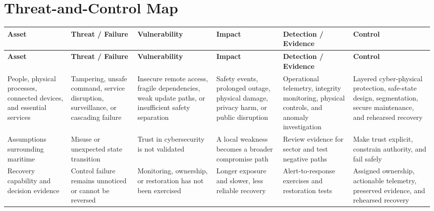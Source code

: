 \documentclass[11pt]{article}
\begin{document}
\section*{Threat-and-Control Map}
\begingroup\scriptsize\setlength{\tabcolsep}{2pt}
\begin{longtable}{>{\RaggedRight\arraybackslash}p{}>{\RaggedRight\arraybackslash}p{}>{\RaggedRight\arraybackslash}p{}>{\RaggedRight\arraybackslash}p{}>{\RaggedRight\arraybackslash}p{}>{\RaggedRight\arraybackslash}p{}}
\toprule\rowcolor{Navy}\color{white}\textbf{Asset} & \color{white}\textbf{Threat / Failure} & \color{white}\textbf{Vulnerability} & \color{white}\textbf{Impact} & \color{white}\textbf{Detection / Evidence} & \color{white}\textbf{Control}\\\midrule
\endfirsthead
\toprule\rowcolor{Navy}\color{white}\textbf{Asset} & \color{white}\textbf{Threat / Failure} & \color{white}\textbf{Vulnerability} & \color{white}\textbf{Impact} & \color{white}\textbf{Detection / Evidence} & \color{white}\textbf{Control}\\\midrule
\endhead
People, physical processes, connected devices, and essential services & Tampering, unsafe command, service disruption, surveillance, or cascading failure & Insecure remote access, fragile dependencies, weak update paths, or insufficient safety separation & Safety events, prolonged outage, physical damage, privacy harm, or public disruption & Operational telemetry, integrity monitoring, physical controls, and anomaly investigation & Layered cyber-physical protection, safe-state design, segmentation, secure maintenance, and rehearsed recovery\\\midrule
Assumptions surrounding maritime & Misuse or unexpected state transition & Trust in cybersecurity is not validated & A local weakness becomes a broader compromise path & Review evidence for sector and test negative paths & Make trust explicit, constrain authority, and fail safely\\\midrule
Recovery capability and decision evidence & Control failure remains unnoticed or cannot be reversed & Monitoring, ownership, or restoration has not been exercised & Longer exposure and slower, less reliable recovery & Alert-to-response exercises and restoration tests & Assigned ownership, actionable telemetry, preserved evidence, and rehearsed recovery\\\midrule
\bottomrule
\end{longtable}
\endgroup
\end{document}
